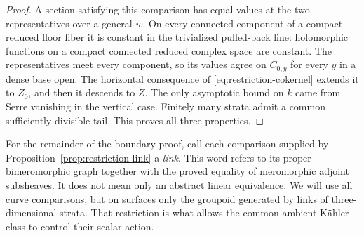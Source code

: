 \begin{proof}
A section satisfying this comparison has equal values at the two
representatives over a general \(w\).  On every connected component of
a compact reduced floor fiber it is constant in the trivialized pulled-back
line: holomorphic functions on a compact connected reduced complex space
are constant.  The representatives meet every component, so its values
agree on \(C_{0,y}\) for every \(y\) in a dense base open.  The horizontal consequence of
\eqref{eq:restriction-cokernel} extends it to \(Z_0\), and then it descends
to \(Z\).  The only asymptotic bound on \(k\) came from Serre vanishing in
the vertical case.  Finitely many strata admit a common sufficiently
divisible tail.  This proves all three properties.
\end{proof}

For the remainder of the boundary proof, call each comparison supplied
by Proposition~\ref{prop:restriction-link} a \emph{link}.  This word
refers to its proper bimeromorphic graph together with the proved equality
of meromorphic adjoint subsheaves.  It does not mean only an abstract
linear equivalence.  We will use all curve comparisons, but on surfaces
only the groupoid generated by links of three-dimensional strata.  That
restriction is what allows the common ambient K\"ahler class to control
their scalar action.
